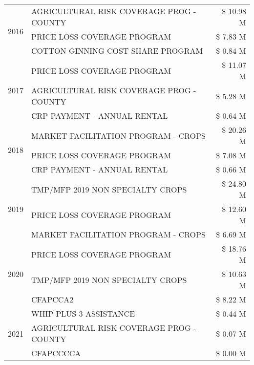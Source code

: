 \begin{tabular}{llr}
\multirow[t]{3}{*}{2016} & AGRICULTURAL RISK COVERAGE PROG - COUNTY & \$ 10.98 M \\
 & PRICE LOSS COVERAGE PROGRAM & \$ 7.83 M \\
 & COTTON GINNING COST SHARE PROGRAM & \$ 0.84 M \\
\cline{1-3}
\multirow[t]{3}{*}{2017} & PRICE LOSS COVERAGE PROGRAM & \$ 11.07 M \\
 & AGRICULTURAL RISK COVERAGE PROG - COUNTY & \$ 5.28 M \\
 & CRP PAYMENT - ANNUAL RENTAL & \$ 0.64 M \\
\cline{1-3}
\multirow[t]{3}{*}{2018} & MARKET FACILITATION PROGRAM - CROPS & \$ 20.26 M \\
 & PRICE LOSS COVERAGE PROGRAM & \$ 7.08 M \\
 & CRP PAYMENT - ANNUAL RENTAL & \$ 0.66 M \\
\cline{1-3}
\multirow[t]{3}{*}{2019} & TMP/MFP 2019 NON SPECIALTY CROPS & \$ 24.80 M \\
 & PRICE LOSS COVERAGE PROGRAM & \$ 12.60 M \\
 & MARKET FACILITATION PROGRAM - CROPS & \$ 6.69 M \\
\cline{1-3}
\multirow[t]{3}{*}{2020} & PRICE LOSS COVERAGE PROGRAM & \$ 18.76 M \\
 & TMP/MFP 2019 NON SPECIALTY CROPS & \$ 10.63 M \\
 & CFAPCCA2 & \$ 8.22 M \\
\cline{1-3}
\multirow[t]{3}{*}{2021} & WHIP PLUS 3 ASSISTANCE & \$ 0.44 M \\
 & AGRICULTURAL RISK COVERAGE PROG - COUNTY & \$ 0.07 M \\
 & CFAPCCCCA & \$ 0.00 M \\
\cline{1-3}
\bottomrule
\end{tabular}
